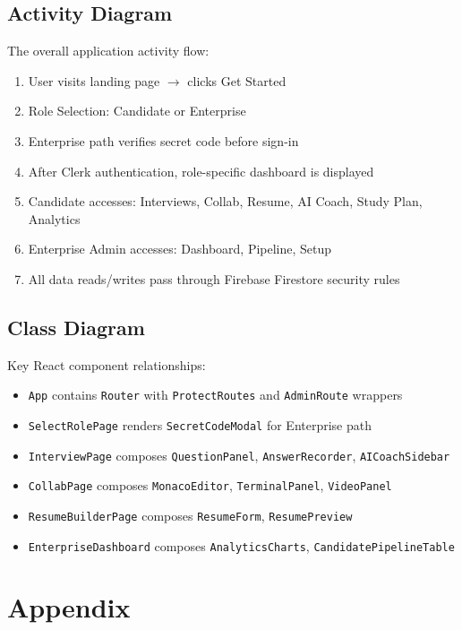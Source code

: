 \documentclass{fisatinternship}
\begin{document}
\section{Activity Diagram}
The overall application activity flow:
\begin{enumerate}
  \item User visits landing page $\to$ clicks Get Started
  \item Role Selection: Candidate or Enterprise
  \item Enterprise path verifies secret code before sign-in
  \item After Clerk authentication, role-specific dashboard is displayed
  \item Candidate accesses: Interviews, Collab, Resume, AI Coach, Study Plan, Analytics
  \item Enterprise Admin accesses: Dashboard, Pipeline, Setup
  \item All data reads/writes pass through Firebase Firestore security rules
\end{enumerate}

\section{Class Diagram}
Key React component relationships:
\begin{itemize}
  \item \texttt{App} contains \texttt{Router} with \texttt{ProtectRoutes} and
        \texttt{AdminRoute} wrappers
  \item \texttt{SelectRolePage} renders \texttt{SecretCodeModal} for Enterprise path
  \item \texttt{InterviewPage} composes \texttt{QuestionPanel}, \texttt{AnswerRecorder},
        \texttt{AICoachSidebar}
  \item \texttt{CollabPage} composes \texttt{MonacoEditor}, \texttt{TerminalPanel},
        \texttt{VideoPanel}
  \item \texttt{ResumeBuilderPage} composes \texttt{ResumeForm}, \texttt{ResumePreview}
  \item \texttt{EnterpriseDashboard} composes \texttt{AnalyticsCharts},
        \texttt{CandidatePipelineTable}
\end{itemize}

\chapter{Appendix}
\end{document}
